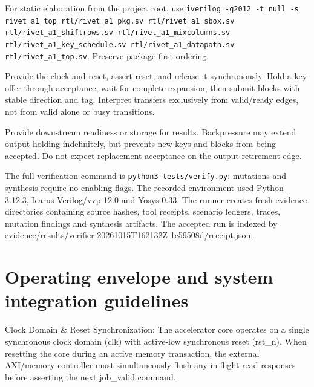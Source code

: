 \documentclass[11pt,a4paper]{article}
\begin{document}
For static elaboration from the project root,\allowbreak{} use \texttt{iverilog -g2012 -t null -s rivet\_\allowbreak{}a1\_\allowbreak{}top rtl/\allowbreak{}rivet\_\allowbreak{}a1\_\allowbreak{}pkg.sv rtl/\allowbreak{}rivet\_\allowbreak{}a1\_\allowbreak{}sbox.sv rtl/\allowbreak{}rivet\_\allowbreak{}a1\_\allowbreak{}shiftrows.sv rtl/\allowbreak{}rivet\_\allowbreak{}a1\_\allowbreak{}mixcolumns.sv rtl/\allowbreak{}rivet\_\allowbreak{}a1\_\allowbreak{}key\_\allowbreak{}schedule.sv rtl/\allowbreak{}rivet\_\allowbreak{}a1\_\allowbreak{}datapath.sv rtl/\allowbreak{}rivet\_\allowbreak{}a1\_\allowbreak{}top.sv}. Preserve package-first ordering.


Provide the clock and reset,\allowbreak{} assert reset,\allowbreak{} and release it synchronously. Hold a key offer through acceptance,\allowbreak{} wait for complete expansion,\allowbreak{} then submit blocks with stable direction and tag. Interpret transfers exclusively from valid/\allowbreak{}ready edges,\allowbreak{} not from valid alone or busy transitions.


Provide downstream readiness or storage for results. Backpressure may extend output holding indefinitely,\allowbreak{} but prevents new keys and blocks from being accepted. Do not expect replacement acceptance on the output-retirement edge.


The full verification command is \texttt{python3 tests/\allowbreak{}verify.py}; mutations and synthesis require no enabling flags. The recorded environment used Python 3.12.3,\allowbreak{} Icarus Verilog/\allowbreak{}vvp 12.0 and Yosys 0.33. The runner creates fresh evidence directories containing source hashes,\allowbreak{} tool receipts,\allowbreak{} scenario ledgers,\allowbreak{} traces,\allowbreak{} mutation findings and synthesis artifacts. The accepted run is indexed by evidence/\allowbreak{}results/\allowbreak{}verifier-20261015T162132Z-1c59508d/\allowbreak{}receipt.json.


\section{Operating envelope and system integration guidelines}

Clock Domain \& Reset Synchronization: The accelerator core operates on a single synchronous clock domain (\allowbreak{}clk)\allowbreak{} with active-low synchronous reset (\allowbreak{}rst\_\allowbreak{}n)\allowbreak{}. When resetting the core during an active memory transaction,\allowbreak{} the external AXI/\allowbreak{}memory controller must simultaneously flush any in-flight read responses before asserting the next job\_\allowbreak{}valid command.
\end{document}
